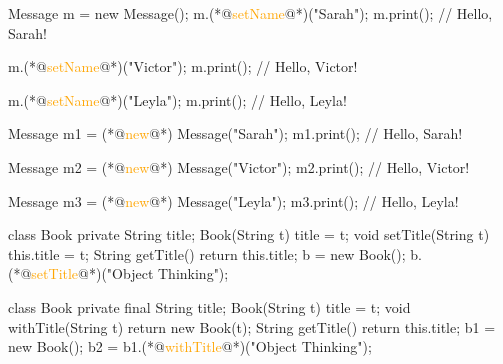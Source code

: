 \documentclass{article}
\begin{document}

\pptToc


\begin{pptWide}{2}
{\small\begin{ffcode}
Message m = new Message();
m.(*@\textcolor{orange}{setName}@*)("Sarah");
m.print(); // Hello, Sarah!

m.(*@\textcolor{orange}{setName}@*)("Victor");
m.print(); // Hello, Victor!

m.(*@\textcolor{orange}{setName}@*)("Leyla");
m.print(); // Hello, Leyla!
\end{ffcode}
}
\par\columnbreak\par
{\small\begin{ffcode}
Message m1 = (*@\textcolor{orange}{new}@*) Message("Sarah");
m1.print(); // Hello, Sarah!

Message m2 = (*@\textcolor{orange}{new}@*) Message("Victor");
m2.print(); // Hello, Victor!

Message m3 = (*@\textcolor{orange}{new}@*) Message("Leyla");
m3.print(); // Hello, Leyla!
\end{ffcode}
}
\end{pptWide}
\par
\plush{}


\begin{pptWide}{2}
{\small\begin{ffcode}
class Book {
  private String title;
  Book(String t) { title = t; }
  void setTitle(String t) {
    this.title = t;
  }
  String getTitle() {
    return this.title;
  }
}
b = new Book();
b.(*@\textcolor{orange}{setTitle}@*)("Object Thinking");
\end{ffcode}
}
\par\columnbreak\par
{\small\begin{ffcode}
class Book {
  private final String title;
  Book(String t) { title = t; }
  void withTitle(String t) {
    return new Book(t);
  }
  String getTitle() {
    return this.title;
  }
}
b1 = new Book();
b2 = b1.(*@\textcolor{orange}{withTitle}@*)("Object Thinking");
\end{ffcode}
}
\end{pptWide}
\par
\plush{}
\end{document}
